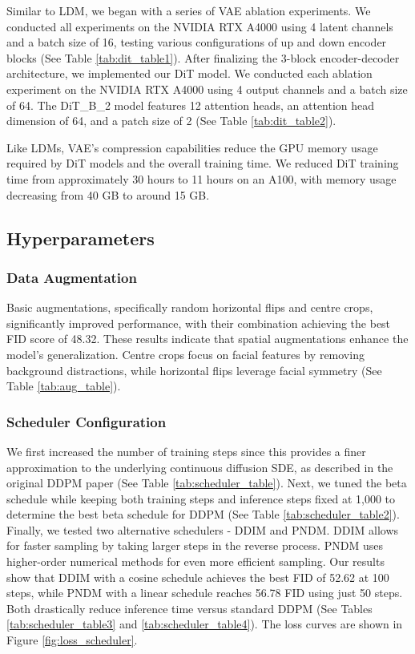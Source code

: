 \documentclass[conference]{IEEEtran}
\begin{document}
Similar to LDM, we began with a series of VAE ablation experiments. We conducted all experiments on the NVIDIA RTX A4000 using 4 latent channels and a batch size of 16, testing various configurations of up and down encoder blocks (See Table \ref{tab:dit_table1}). After finalizing the 3-block encoder-decoder architecture, we implemented our DiT model. We conducted each ablation experiment on the NVIDIA RTX A4000 using 4 output channels and a batch size of 64. The DiT\_B\_2 model features 12 attention heads, an attention head dimension of 64, and a patch size of 2 (See Table \ref{tab:dit_table2}).

Like LDMs, VAE's compression capabilities reduce the GPU memory usage required by DiT models and the overall training time. We reduced DiT training time from approximately 30 hours to 11 hours on an A100, with memory usage decreasing from 40 GB to around 15 GB.

\subsection{Hyperparameters}\label{e_hyperparameters}

\subsubsection{Data Augmentation}\label{e_data}

Basic augmentations, specifically random horizontal flips and centre crops, significantly improved performance, with their combination achieving the best FID score of 48.32. These results indicate that spatial augmentations enhance the model's generalization. Centre crops focus on facial features by removing background distractions, while horizontal flips leverage facial symmetry (See Table \ref{tab:aug_table}).

\subsubsection{Scheduler Configuration}

We first increased the number of training steps since this provides a finer approximation to the underlying continuous diffusion SDE, as described in the original DDPM paper (See Table \ref{tab:scheduler_table}). Next, we tuned the beta schedule while keeping both training steps and inference steps fixed at 1,000 to determine the best beta schedule for DDPM (See Table \ref{tab:scheduler_table2}). Finally, we tested two alternative schedulers - DDIM and PNDM. DDIM allows for faster sampling by taking larger steps in the reverse process. PNDM uses higher-order numerical methods for even more efficient sampling. Our results show that DDIM with a cosine schedule achieves the best FID of 52.62 at 100 steps, while PNDM with a linear schedule reaches 56.78 FID using just 50 steps. Both drastically reduce inference time versus standard DDPM (See Tables \ref{tab:scheduler_table3} and \ref{tab:scheduler_table4}). The loss curves are shown in Figure \ref{fig:loss_scheduler}.
\end{document}
